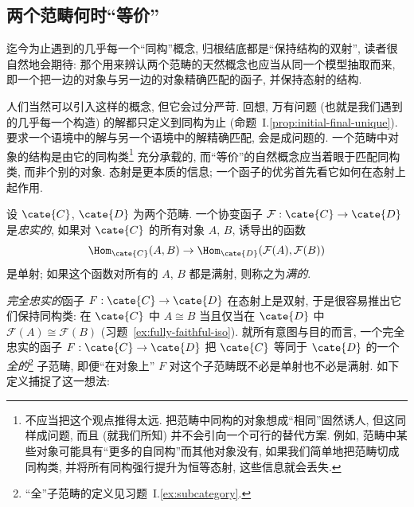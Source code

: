 \subsection{两个范畴何时``等价''}
\label{subsec:equiv-categories}

迄今为止遇到的几乎每一个``同构''概念, 归根结底都是``保持结构的双射'', 读者很自然地会期待: 那个用来辨认两个范畴的天然概念也应当从同一个模型抽取而来, 即一个把一边的对象与另一边的对象精确匹配的函子, 并保持态射的结构.

人们当然可以引入这样的概念, 但它会过分严苛. 回想, 万有问题 (也就是我们遇到的几乎每一个构造) 的解都只定义到同构为止 (命题~I.\ref{prop:initial-final-unique}). 要求一个语境中的解与另一个语境中的解精确匹配, 会是成问题的. 一个范畴中对象的结构是由它的同构类\footnote{不应当把这个观点推得太远. 把范畴中同构的对象想成``相同''固然诱人, 但这同样成问题, 而且 (就我们所知) 并不会引向一个可行的替代方案. 例如, 范畴中某些对象可能具有``更多的自同构''而其他对象没有, 如果我们简单地把范畴切成同构类, 并将所有同构强行提升为恒等态射, 这些信息就会丢失.} 充分承载的, 而``等价''的自然概念应当着眼于匹配同构类, 而非个别的对象. 态射是更本质的信息; 一个函子的优劣首先看它如何在态射上起作用.

\begin{definition}\label{def:faithful-full}
设 $\cate{C}$, $\cate{D}$ 为两个范畴. 一个协变函子 $\mathcal{F}:\cate{C}\to\cate{D}$ 是\emph{忠实的}, 如果对 $\cate{C}$ 的所有对象 $A$, $B$, 诱导出的函数
\[
\Hom_{\cate{C}}(A,B)\to\Hom_{\cate{D}}(\mathcal{F}(A),\mathcal{F}(B))
\]
是单射; 如果这个函数对所有的 $A$, $B$ 都是满射, 则称之为\emph{满的}.
\end{definition}

\emph{完全忠实的}函子 $F:\cate{C}\to\cate{D}$ 在态射上是双射, 于是很容易推出它们保持同构类: 在 $\cate{C}$ 中 $A\cong B$ 当且仅当在 $\cate{D}$ 中 $\mathcal{F}(A)\cong\mathcal{F}(B)$ (习题~\ref{ex:fully-faithful-iso}). 就所有意图与目的而言, 一个完全忠实的函子 $F:\cate{C}\to\cate{D}$ 把 $\cate{C}$ 等同于 $\cate{D}$ 的一个\emph{全的}\footnote{``全''子范畴的定义见习题~I.\ref{ex:subcategory}.} 子范畴, 即便``在对象上'' $F$ 对这个子范畴既不必是单射也不必是满射. 如下定义捕捉了这一想法:

